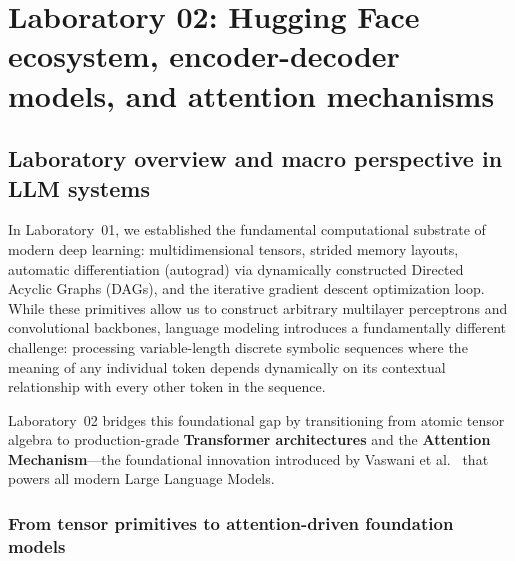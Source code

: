 \documentclass[../labs.tex]{subfiles}
\begin{document}
\chapter{Laboratory 02: Hugging Face ecosystem, encoder-decoder models, and attention mechanisms}
\label{ch:lab02_huggingface_attention}

\section{Laboratory overview and macro perspective in LLM systems}

In Laboratory~01, we established the fundamental computational substrate of modern deep learning: multidimensional tensors, strided memory layouts, automatic differentiation (autograd) via dynamically constructed Directed Acyclic Graphs (DAGs), and the iterative gradient descent optimization loop. While these primitives allow us to construct arbitrary multilayer perceptrons and convolutional backbones, language modeling introduces a fundamentally different challenge: processing variable-length discrete symbolic sequences where the meaning of any individual token depends dynamically on its contextual relationship with every other token in the sequence.

Laboratory~02 bridges this foundational gap by transitioning from atomic tensor algebra to production-grade \textbf{Transformer architectures} and the \textbf{Attention Mechanism}---the foundational innovation introduced by Vaswani et al.~\cite{vaswani2017} that powers all modern Large Language Models.

\subsection{From tensor primitives to attention-driven foundation models}
\end{document}
